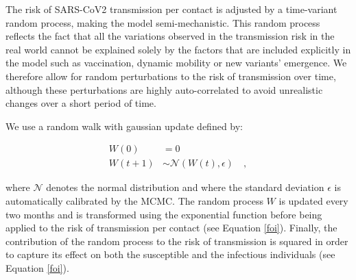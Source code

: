 The risk of SARS-CoV2 transmission per contact is adjusted by a time-variant random process, making
the model semi-mechanistic. This random process reflects the fact that all the variations observed in the transmission
risk in the real world cannot be explained solely by the factors that are included explicitly in the model such as vaccination, dynamic mobility or new variants' emergence.
We therefore allow for random perturbations to the risk of transmission over time, although these perturbations are highly auto-correlated
to avoid unrealistic changes over a short period of time.

We use a random walk with gaussian update defined by:

\begin{equation}
    \label{eq:random_process}
    \begin{split}
    W(0) & = 0 \\
    W(t+1) & \sim \mathcal{N}(W(t), \epsilon) \quad ,
    \end{split}
\end{equation}

where $\mathcal{N}$ denotes the normal distribution and where the standard deviation $\epsilon$ is automatically calibrated by the MCMC.
The random process $W$ is updated every two months and is transformed using the exponential function before being applied to the risk of transmission per contact (see Equation \ref{foi}).
Finally, the contribution of the random process to the risk of transmission is squared in order to capture its effect
on both the susceptible and the infectious individuals (see Equation \ref{foi}). 